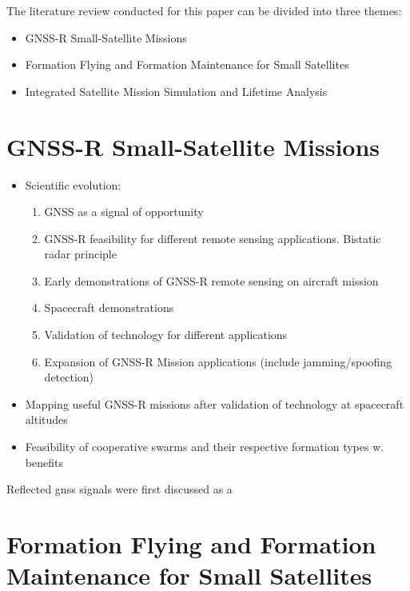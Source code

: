 The literature review conducted for this paper can be divided into three themes:
\begin{itemize}
    \item GNSS-R Small-Satellite Missions
    \item Formation Flying and Formation Maintenance for Small Satellites
    \item Integrated Satellite Mission Simulation and Lifetime Analysis    
\end{itemize}


\section{GNSS-R Small-Satellite Missions}

\begin{itemize}
    \item Scientific evolution:
    \begin{enumerate}
        \item GNSS as a signal of opportunity
        \item GNSS-R feasibility for different remote sensing applications. Bistatic radar principle
        \item Early demonstrations of GNSS-R remote sensing on aircraft mission
        \item Spacecraft demonstrations
        \item Validation of technology for different applications
        \item Expansion of GNSS-R Mission applications (include jamming/spoofing detection)
    \end{enumerate}
    \item Mapping useful GNSS-R missions after validation of technology at spacecraft altitudes  
    \item Feasibility of cooperative swarms and their respective formation types w. benefits
\end{itemize}

Reflected \gls{gnss} signals were first discussed as a



\section{Formation Flying and Formation Maintenance for Small Satellites}

